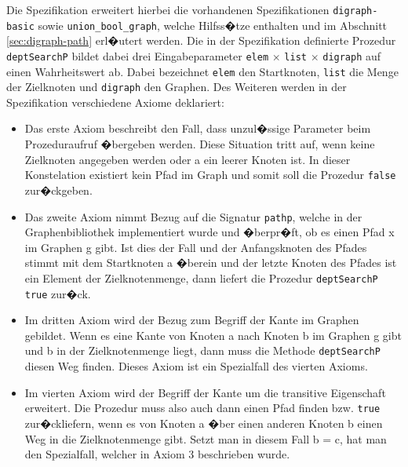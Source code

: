 Die Spezifikation erweitert hierbei die vorhandenen Spezifikationen \texttt{digraph-basic} sowie \texttt{union\_bool\_graph}, welche Hilfss�tze enthalten und im Abschnitt \ref{sec:digraph-path} erl�utert werden.
Die in der Spezifikation definierte Prozedur \texttt{deptSearchP} bildet dabei drei Eingabeparameter \texttt{elem} $\times$ \texttt{list} $\times$ \texttt{digraph} auf einen Wahrheitswert ab.
Dabei bezeichnet \texttt{elem} den Startknoten, \texttt{list} die Menge der Zielknoten und \texttt{digraph} den Graphen.
Des Weiteren werden in der Spezifikation verschiedene Axiome deklariert:\\
\begin{itemize}
\item Das erste Axiom beschreibt den Fall, dass unzul�ssige Parameter beim Prozeduraufruf �bergeben werden. Diese Situation tritt auf, wenn keine Zielknoten angegeben werden oder a ein leerer Knoten ist. In dieser Konstelation existiert kein Pfad im Graph und somit soll die Prozedur \texttt{false} zur�ckgeben.  
\item Das zweite Axiom nimmt Bezug auf die Signatur \texttt{pathp}, welche in der Graphenbibliothek implementiert wurde und �berpr�ft, ob es einen Pfad x im Graphen g gibt. Ist dies der Fall und der Anfangsknoten des Pfades stimmt mit dem Startknoten a �berein und der letzte Knoten des Pfades ist ein Element der Zielknotenmenge, dann liefert die Prozedur \texttt{deptSearchP} \texttt{true} zur�ck.
\item Im dritten Axiom wird der Bezug zum Begriff der Kante im Graphen gebildet. Wenn es eine Kante von Knoten a nach Knoten b im Graphen g gibt und b in der Zielknotenmenge liegt, dann muss die Methode \texttt{deptSearchP} diesen Weg finden. Dieses Axiom ist ein Spezialfall des vierten Axioms.
\item Im vierten Axiom wird der Begriff der Kante um die transitive Eigenschaft erweitert. Die Prozedur muss also auch dann einen Pfad finden bzw. \texttt{true} zur�ckliefern, wenn es von Knoten a �ber einen anderen Knoten b einen Weg in die Zielknotenmenge gibt. Setzt man in diesem Fall b = c, hat man den Spezialfall, welcher in Axiom 3 beschrieben wurde. 
\end{itemize}




